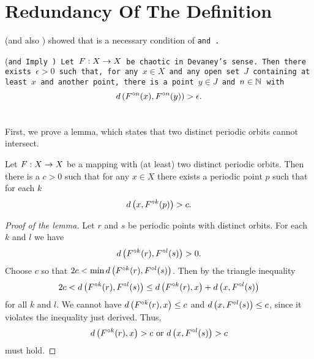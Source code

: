 \documentclass[12pt,draft,twoside]{book}
\begin{document}
  \section{Redundancy Of The Definition}
  \citet{silverman} (and also \citet{banks}) showed that \sdic is a necessary condition of \tt and \dpp.
  \begin{theorem}
    (\tt and \dpp Imply \sdic)
    Let $F: X\rightarrow X$ be chaotic in Devaney's sense.
    Then there exists $\epsilon > 0$ such that, for any $x\in X$ and any open set $J$ containing at least $x$ and another point, there is a point $y\in J$ and $n\in \mathbb{N}$ with
    \begin{equation*}
      d\left( F^{\circ n}(x),F^{\circ n}(y) \right) > \epsilon.
    \end{equation*}
    \label{thm:silverman}
  \end{theorem}
  First, we prove a lemma, which states that two distinct periodic orbits cannot intersect.
  \begin{lemma}
    Let $F: X\rightarrow X$ be a mapping with (at least) two distinct periodic orbits.
    Then there is a $c > 0$ such that for any $x\in X$ there exists a periodic
    point $p$ such that for each $k$
    \begin{equation*}
      d\left( x, F^{\circ k}(p) \right) > c.
    \end{equation*}
    \label{lem:dev1}
    \begin{proof}[Proof of the lemma]
      Let $r$ and $s$ be periodic points with distinct orbits. For each $k$ and $l$ we have
      \begin{equation*}
        d\left( F^{\circ k}(r), F^{\circ l}(s) \right) > 0.
      \end{equation*}
      Choose $c$ so that $2c < \min d\left( F^{\circ k}(r),F^{\circ l}(s) \right)$.
      Then by the triangle inequality
      \begin{equation*}
        2c < d\left( F^{\circ k}(r),F^{\circ l}(s) \right) \leq d\left( F^{\circ k}(r),x \right) + d\left( x,F^{\circ l}(s) \right)
      \end{equation*}
      for all $k$ and $l$.
      We cannot have $d\left( F^{\circ k}(r),x \right) \leq c$ and $d\left( x,F^{\circ l}(s) \right) \leq c$, since it violates the inequality just derived.
      Thus,
      \begin{equation*}
        d\left( F^{\circ k}(r),x \right) > c \mbox{ or } d\left( x,F^{\circ l}(s) \right) > c
      \end{equation*}
      must hold.
    \end{proof}
  \end{lemma}
\end{document}
